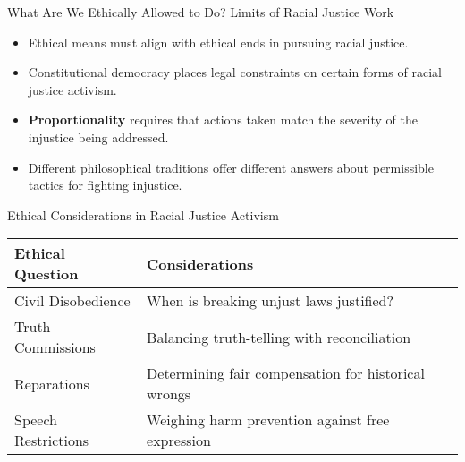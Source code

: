 \documentclass{beamer}
\begin{document}
	\begin{frame}{What Are We Ethically Allowed to Do? Limits of Racial Justice Work}
		\begin{itemize}
			\item Ethical means must align with ethical ends in pursuing racial justice.
			\item Constitutional democracy places legal constraints on certain forms of racial justice activism.
			\item \textbf{Proportionality} requires that actions taken match the severity of the injustice being addressed.
			\item Different philosophical traditions offer different answers about permissible tactics for fighting injustice.
		\end{itemize}
		
		\begin{exampleblock}{Ethical Considerations in Racial Justice Activism}
			\begin{tabular}{|l|l|}
				\hline
				\textbf{Ethical Question} & \textbf{Considerations} \\
				\hline
				Civil Disobedience & When is breaking unjust laws justified? \\
				Truth Commissions & Balancing truth-telling with reconciliation \\
				Reparations & Determining fair compensation for historical wrongs \\
				Speech Restrictions & Weighing harm prevention against free expression \\
				\hline
			\end{tabular}
		\end{exampleblock}
	\end{frame}
	
\end{document}
